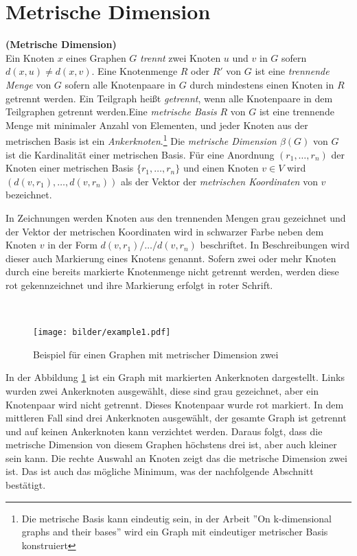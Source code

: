 \newpage
\section{Metrische Dimension}
\label{MDT}
\begin{defi}{\textbf{(Metrische Dimension)}}\\
Ein Knoten $x$ eines Graphen $G$ \emph{trennt} zwei Knoten $u$ und $v$ in $G$ sofern $d(x, u) \neq d(x, v)$. Eine Knotenmenge $R$ oder $R'$ von $G$ ist eine \emph{trennende Menge} von $G$ sofern alle Knotenpaare in $G$ durch mindestens einen Knoten in $R$ getrennt werden. Ein Teilgraph heißt \emph{getrennt}, wenn alle Knotenpaare in dem Teilgraphen getrennt werden.\newline \newline Eine \emph{metrische Basis} $R$ von $G$ ist eine trennende Menge mit minimaler Anzahl von Elementen, und jeder Knoten aus der metrischen Basis ist ein \emph{Ankerknoten}.\footnote{Die metrische Basis kann eindeutig sein, in der Arbeit ''On k-dimensional graphs and their bases''\cite{bases} wird ein Graph mit eindeutiger metrischer Basis konstruiert} \newline\newline %
Die \emph{metrische Dimension $\beta(G)$} von $G$ ist die Kardinalität einer metrischen Basis. Für eine Anordnung $(r_1,\ldots,r_n)$ der Knoten einer metrischen Basis $\{r_1,\ldots,r_n\}$ und einen Knoten $v \in V$ wird $(d(v, r_1 ), \ldots , d(v, r_n ))$ als der Vektor der \emph{metrischen Koordinaten} von $v$ bezeichnet.
\end{defi}
\begin{bem}
In Zeichnungen werden Knoten aus den trennenden Mengen grau gezeichnet und der Vektor der metrischen Koordinaten wird in schwarzer Farbe neben dem Knoten $v$ in der Form $d(v, r_1 )/ \ldots / d(v, r_n )$ beschriftet. In Beschreibungen wird dieser auch Markierung eines Knotens genannt. Sofern zwei oder mehr Knoten durch eine bereits markierte Knotenmenge nicht getrennt werden, werden diese rot gekennzeichnet und ihre Markierung erfolgt in roter Schrift. 
\end{bem}
\begin{bsp}~
\begin{figure}[h!]
		\centering 		 
   \texttt{[image: bilder/example1.pdf]}
	\caption{Beispiel für einen Graphen mit metrischer Dimension zwei}
  	 \label{bild:bsp}
  	 \end{figure}
In der Abbildung \ref{bild:bsp} ist ein Graph mit markierten Ankerknoten dargestellt.
Links wurden zwei Ankerknoten ausgewählt, diese sind grau gezeichnet, aber ein Knotenpaar wird nicht getrennt. Dieses Knotenpaar wurde rot markiert. In dem mittleren Fall sind drei Ankerknoten ausgewählt, der gesamte Graph ist getrennt und auf keinen Ankerknoten kann verzichtet werden. Daraus folgt, dass die metrische Dimension von diesem Graphen höchstens drei ist, aber auch kleiner sein kann. Die rechte Auswahl an Knoten zeigt das die metrische Dimension zwei ist. Das ist auch das mögliche Minimum, was der nachfolgende Abschnitt bestätigt.
\end{bsp}
